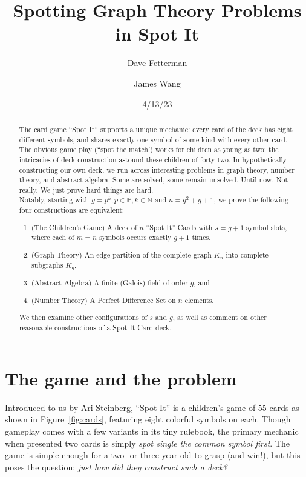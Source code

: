 \documentclass[11pt, oneside]{article} 	%
\title{Spotting Graph Theory Problems in Spot It}
\author[1]{Dave Fetterman}
\author[2]{James Wang}
\affil[1]{Obviously Unemployed}
\affil[2]{Surprisingly Employed}
\date{4/13/23}
\begin{document}
\maketitle

\begin{abstract}

The card game ``Spot It'' supports a unique mechanic: every card of the deck has eight different symbols, and shares exactly one symbol of some kind with every other card.  The obvious game play (``spot the match') works for children as young as two; the intricacies of deck construction astound these children of forty-two. In hypothetically constructing our own deck, we run across interesting problems in graph theory, number theory, and abstract algebra.  Some are solved, some remain unsolved.  Until now.  Not really.  We just prove hard things are hard.
\\

Notably, starting with $g=p^k, p \in \mathbb{P}, k \in \mathbb{N}$ and $n = g^2+g+1$, we prove the following four constructions are equivalent:
\\
\begin{enumerate}
\item (The Children's Game) A deck of $n$ ``Spot It'' Cards with $s=g+1$ symbol slots, where each of $m = n$ symbols occurs exactly $g+1$ times,
\item (Graph Theory) An edge partition of the complete graph $K_n$ into complete subgraphs $K_g$,
\item (Abstract Algebra) A finite (Galois) field of order $g$, and
\item (Number Theory) A Perfect Difference Set\cite{1} on $n$ elements.
\end{enumerate} 
   
We then examine other configurations of $s$ and $g$, as well as comment on other reasonable constructions of a Spot It Card deck.

\end{abstract}

\section{The game and the problem}

Introduced to us by Ari Steinberg, ``Spot It'' is a children's game of 55 cards as shown in Figure~\ref{fig:cards}, featuring eight colorful symbols on each.  Though gameplay comes with a few variants in its tiny rulebook, the primary mechanic when presented two cards is simply \emph{spot single the common symbol first}. The game is simple enough for a two- or three-year old to grasp (and win!), but this poses the question: \emph{just how did they construct such a deck?} 
\end{document}
